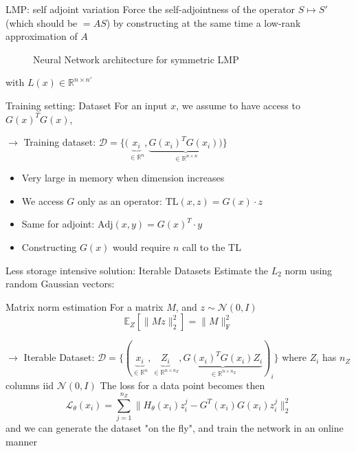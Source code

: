 \documentclass[10pt,aspectratio=169]{beamer}
\begin{document}
\begin{frame}{LMP: self adjoint variation}
    Force the self-adjointness of the operator $S \mapsto S'$ (which should be $=AS$) by constructing at the same time a low-rank approximation of $A$
\begin{figure}
    \centering
    \resizebox{0.8\textwidth}{!}{    
    }
    \caption{Neural Network architecture for symmetric LMP}
    \label{fig:archi_nn_lmp_sym}
\end{figure}
with $L(x) \in \mathbb{R}^{n \times n'}$
\end{frame}

\begin{frame}{Training setting: Dataset}
For an input $x$, we assume to have access to $G(x)^TG(x)$,

$\rightarrow$ Training dataset: $\mathcal{D} = \{(\underbrace{x_i}_{\in \mathbb{R}^n}, \underbrace{G(x_i)^TG(x_i))}_{\in \mathbb{R}^{n\times n}}\}$

\begin{itemize}
    \item Very large in memory when dimension increases
    \item We access $G$ only as an operator: $\mathrm{TL}(x, z) = G(x) \cdot z$
    \item Same for adjoint: $\mathrm{Adj}(x, y) = G(x)^T \cdot y$
    \item Constructing $G(x)$ would require $n$ call to the TL
\end{itemize}
\end{frame}
\begin{frame}{Less storage intensive solution: Iterable Datasets}
    Estimate the $L_2$ norm using random Gaussian vectors:
    \begin{block}{Matrix norm estimation}
    For a matrix $M$, and $z \sim \mathcal{N}(0, I)$
    \begin{equation}
        \mathbb{E}_Z\left[\|Mz\|^2_2\right] = \|M\|^2_{\mathrm{F}}
        \end{equation}
    \end{block}
    $\rightarrow$ Iterable Dataset: $\mathcal{D} = \{(\underbrace{x_i}_{\in \mathbb{R}^n}, \underbrace{Z_i}_{\in \mathbb{R}^{n \times n_Z}}, \underbrace{G(x_i)^TG(x_i)Z_i}_{\in \mathbb{R}^{n\times n_Z}})_i\}$ where $Z_i$ has $n_Z$ columns iid $\mathcal{N}(0, I)$
    The loss for a data point becomes then
    \begin{equation}
        \mathcal{L}_{\theta}(x_i) = \sum_{j=1}^{n_Z} \| H_{\theta}(x_i) z_i^j - G^T(x_i)G(x_i)z_i^j \|^2_2
    \end{equation}
    and we can generate the dataset "on the fly", and train the network in an online manner
\end{frame}
\end{document}
